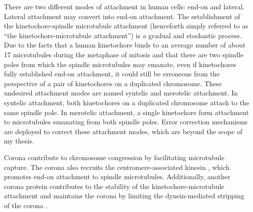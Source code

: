 There are two different modes of attachment in human cells: end-on and lateral. Lateral attachment may convert into end-on attachment. The establishment of the kinetochore-spindle microtubule attachment (henceforth simply referred to as ``the kinetochore-microtubule attachment'') is a gradual and stochastic process. Due to the facts that a human kinetochore binds to an average number of about 17 microtubules during the metaphase of mitosis and that there are two spindle poles from which the spindle microtubules may emanate, even if kinetochores fully established end-on attachment, it could still be erroneous from the perspective of a pair of kinetochores on a duplicated chromosome. These undesired attachment modes are named syntelic and merotelic attachment. In syntelic attachment, both kinetochores on a duplicated chromosome attach to the same spindle pole. In merotelic attachment, a single kinetochore form attachment to microtubules emanating from both spindle poles. Error correction mechanisms are deployed to correct these attachment modes, which are beyond the scope of my thesis.

Corona contribute to chromosome congression by facilitating microtubule capture. The corona also recruits the centromere-associated kinesin , which promotes end-on attachment to spindle microtubules. Additionally, another corona protein  contributes to the stability of the kinetochore-microtubule attachment and maintains the corona by limiting the dynein-mediated stripping of the corona \cite{CENP-FLimitsStripping}.

